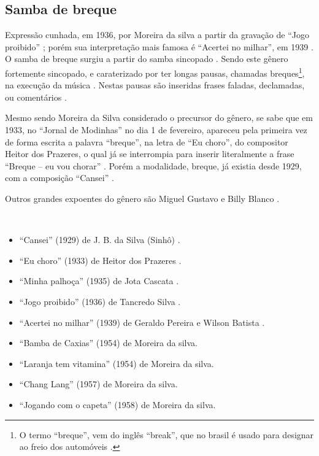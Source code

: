 \subsection{Samba de breque} 

Expressão cunhada, em 1936, por Moreira da silva a partir da gravação de ``Jogo proibido'' \cite[pp. 291]{dourado2004dicionario};
porém sua interpretação mais famosa é ``Acertei no milhar'', em 1939 \cite[pp. 129]{perna2002samba}.
O samba de breque surgiu a partir do samba sincopado \cite[pp. 129]{perna2002samba}.
Sendo este gênero fortemente sincopado, 
e caraterizado por ter longas pausas, chamadas breques\footnote{
O termo ``breque'', vem do inglês ``break'', 
que no brasil é usado para designar ao freio dos automóveis \cite[pp. 684]{marcondes1977enciclopediav2}.}, 
na execução da música \cite[pp. 291]{dourado2004dicionario}.
Nestas pausas são inseridas frases faladas, declamadas, ou comentários \cite[pp. 129]{perna2002samba} \cite[pp. 291]{dourado2004dicionario}. 


Mesmo sendo Moreira da Silva considerado o precursor do gênero, 
se sabe que em 1933, no ``Jornal de Modinhas'' no dia 1 de fevereiro, 
apareceu pela primeira vez de forma escrita a palavra ``breque'', na letra de ``Eu choro'', 
do compositor Heitor dos Prazeres, o qual já se interrompia para inserir literalmente 
a frase ``Breque -- eu vou chorar'' \cite[pp. 291]{dourado2004dicionario} \cite{rizzi2016musica}.
Porém a modalidade, breque, já existia desde 1929, com a composição ``Cansei'' \cite{rizzi2016musica}.

Outros grandes expoentes do gênero são Miguel Gustavo e Billy Blanco \cite[pp. 291]{dourado2004dicionario}.

\begin{example} ~

\begin{itemize}
\item ``Cansei'' (1929) de J. B. da Silva (Sinhô) \cite{rizzi2016musica} \cite{aguiar2013reis}.
\item ``Eu choro'' (1933) de Heitor dos Prazeres  \cite[pp. 291]{dourado2004dicionario}.
\item ``Minha palhoça'' (1935) de Jota Cascata \cite{aguiar2013reis}.
\item ``Jogo proibido'' (1936) de Tancredo Silva \cite{rizzi2016musica}.
\item ``Acertei no milhar'' (1939) de Geraldo Pereira e Wilson Batista \cite[pp. 129]{perna2002samba}.
\item ``Bamba de Caxias'' (1954) de Moreira da silva\cite{subgenerosdosamba2}.
\item ``Laranja tem vitamina'' (1954)  de Moreira da silva\cite{subgenerosdosamba2}.
\item ``Chang Lang'' (1957) de Moreira da silva\cite{subgenerosdosamba2}.
\item ``Jogando com o capeta'' (1958)  de Moreira da silva\cite{subgenerosdosamba2}.
\end{itemize}
\end{example}



